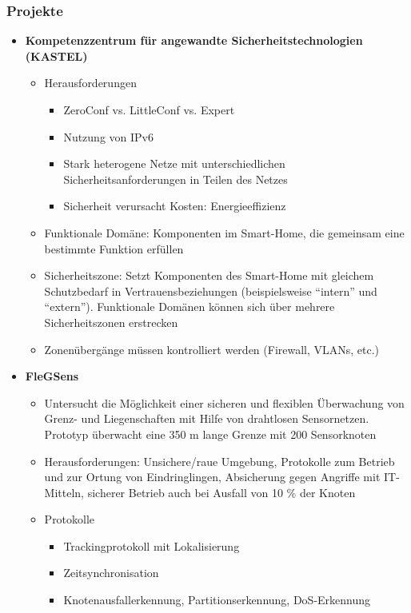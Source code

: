 \subsubsection{Projekte}
\begin{itemize}
	\item \textbf{Kompetenzzentrum für angewandte Sicherheitstechnologien (KASTEL)}
	\begin{itemize}
		\item Herausforderungen
		\begin{itemize}
			\item ZeroConf vs. LittleConf vs. Expert
			\item Nutzung von IPv6
			\item Stark heterogene Netze mit unterschiedlichen Sicherheitsanforderungen in Teilen des Netzes
			\item Sicherheit verursacht Kosten: Energieeffizienz
		\end{itemize}
		\item Funktionale Domäne: Komponenten im Smart-Home, die gemeinsam eine bestimmte Funktion erfüllen
		\item Sicherheitszone: Setzt Komponenten des Smart-Home mit gleichem Schutzbedarf in Vertrauensbeziehungen (beispielsweise "`intern"' und "`extern"'). Funktionale Domänen können sich über mehrere Sicherheitszonen erstrecken
		\item Zonenübergänge müssen kontrolliert werden (Firewall, VLANs, etc.)
	\end{itemize}
	\item \textbf{FleGSens}
	\begin{itemize}
		\item Untersucht die Möglichkeit einer sicheren und flexiblen Überwachung von Grenz- und Liegenschaften mit Hilfe von drahtlosen Sensornetzen. Prototyp überwacht eine 350 m lange Grenze mit 200 Sensorknoten
		\item Herausforderungen: Unsichere/raue Umgebung, Protokolle zum Betrieb und zur Ortung von Eindringlingen, Absicherung gegen Angriffe mit IT-Mitteln, sicherer Betrieb auch bei Ausfall von 10 \% der Knoten
		\item Protokolle
		\begin{itemize}
			\item Trackingprotokoll mit Lokalisierung
			\item Zeitsynchronisation
			\item Knotenausfallerkennung, Partitionserkennung, DoS-Erkennung
		\end{itemize}
	\end{itemize}
\end{itemize}
